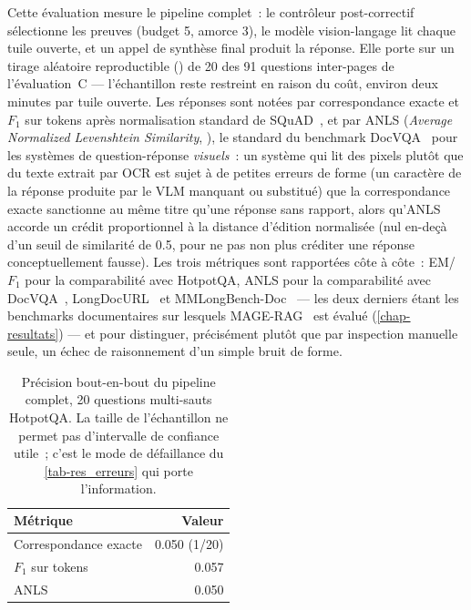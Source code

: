 Cette évaluation mesure le pipeline complet~: le contrôleur post-correctif
sélectionne les preuves (budget \num{5}, amorce \num{3}), le modèle
vision-langage lit chaque tuile ouverte, et un appel de synthèse final
produit la réponse. Elle porte sur un tirage aléatoire reproductible
() de \num{20} des \num{91} questions
inter-pages de l'évaluation~C --- l'échantillon reste restreint en raison du
coût, environ deux minutes par tuile ouverte. Les réponses sont notées par
correspondance exacte et $F_1$ sur tokens après normalisation standard de
SQuAD~\citep{squad2016}, et par ANLS (\emph{Average Normalized Levenshtein
Similarity}, ), le standard du
benchmark DocVQA~\citep{docvqa2021} pour les systèmes de question-réponse
\emph{visuels}~: un système qui lit des pixels plutôt que du texte extrait par
OCR est sujet à de petites erreurs de forme (un caractère de la réponse
produite par le VLM manquant ou substitué) que la correspondance exacte
sanctionne au même titre qu'une réponse sans rapport, alors qu'ANLS accorde un
crédit proportionnel à la distance d'édition normalisée (nul en-deçà d'un
seuil de similarité de \num{0.5}, pour ne pas non plus créditer une réponse
conceptuellement fausse). Les trois métriques sont rapportées côte à côte~:
EM/$F_1$ pour la comparabilité avec HotpotQA, ANLS pour la comparabilité avec
DocVQA~\citep{docvqa2021}, LongDocURL~\citep{longdocurl2024} et
MMLongBench-Doc~\citep{mmlongbenchdoc2024} --- les deux derniers étant les
benchmarks documentaires sur lesquels MAGE-RAG~\citep{magerag2026} est évalué
(\cref{chap-resultats}) --- et pour distinguer, précisément plutôt que par
inspection manuelle seule, un échec de raisonnement d'un simple bruit de
forme.

\begin{table}[t]
\centering
\small
\caption[Évaluation D : précision bout-en-bout]{Précision bout-en-bout du
pipeline complet, \num{20} questions multi-sauts HotpotQA. La taille de
l'échantillon ne permet pas d'intervalle de confiance utile~; c'est le mode de défaillance du \cref{tab-res_erreurs} qui porte l'information.}
\label{tab-res_ablation_d}
\begin{tabular}{@{}l r@{}}
\toprule
Métrique & Valeur \\
\midrule
Correspondance exacte & \num{0.050} \enspace(\num{1}/\num{20}) \\
$F_1$ sur tokens & \num{0.057} \\
ANLS~\citep{docvqa2021} & \num{0.050} \\
\bottomrule
\end{tabular}
\end{table}


